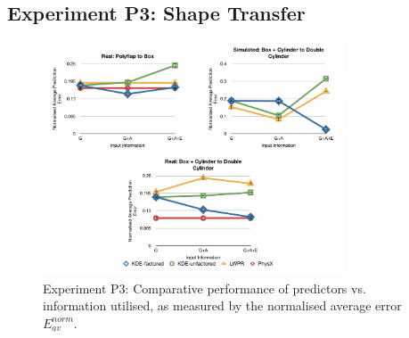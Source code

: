 \subsection{Experiment P3:  Shape Transfer}\label{sec:Results.Shape}
\begin{figure}[t]
\centerline{\includegraphics[width=0.8\textwidth]{./P3-graphs}}
\caption{Experiment P3: Comparative performance of predictors vs. information utilised, as measured by the normalised average error ${E_{av}^{norm}}$. 
}\label{fig:S_av_graphs}
\end{figure}
\newlength{\imgCXwid}
\setlength{\imgCXwid}{2.2cm}

